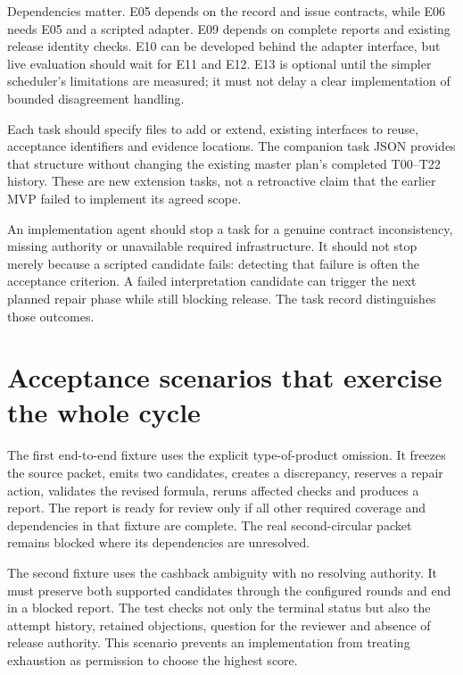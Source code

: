 
Dependencies matter. E05 depends on the record and issue contracts, while E06
needs E05 and a scripted adapter. E09 depends on complete reports and existing
release identity checks. E10 can be developed behind the adapter interface, but
live evaluation should wait for E11 and E12. E13 is optional until the simpler
scheduler's limitations are measured; it must not delay a clear implementation
of bounded disagreement handling.

Each task should specify files to add or extend, existing interfaces to reuse,
acceptance identifiers and evidence locations. The companion task JSON provides
that structure without changing the existing master plan's completed T00--T22
history. These are new extension tasks, not a retroactive claim that the earlier
MVP failed to implement its agreed scope.

An implementation agent should stop a task for a genuine contract inconsistency,
missing authority or unavailable required infrastructure. It should not stop
merely because a scripted candidate fails: detecting that failure is often the
acceptance criterion. A failed interpretation candidate can trigger the next
planned repair phase while still blocking release. The task record distinguishes
those outcomes.

\section{Acceptance scenarios that exercise the whole cycle}
\label{merge:M08:12}


The first end-to-end fixture uses the explicit type-of-product omission. It
freezes the source packet, emits two candidates, creates a discrepancy, reserves
a repair action, validates the revised formula, reruns affected checks and
produces a report. The report is ready for review only if all other required
coverage and dependencies in that fixture are complete. The real second-circular
packet remains blocked where its dependencies are unresolved.

The second fixture uses the cashback ambiguity with no resolving authority. It
must preserve both supported candidates through the configured rounds and end in
a blocked report. The test checks not only the terminal status but also the
attempt history, retained objections, question for the reviewer and absence of
release authority. This scenario prevents an implementation from treating
exhaustion as permission to choose the highest score.

